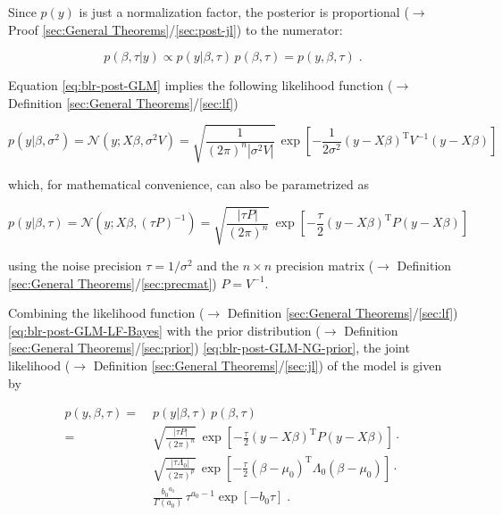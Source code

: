 \documentclass[a4paper,12pt,twoside]{book}
\begin{document}
Since $p(y)$ is just a normalization factor, the posterior is proportional ($\rightarrow$ Proof \ref{sec:General Theorems}/\ref{sec:post-jl}) to the numerator:

\begin{equation} \label{eq:blr-post-GLM-NG-post-JL}
p(\beta,\tau|y) \propto p(y|\beta,\tau) \, p(\beta,\tau) = p(y,\beta,\tau) \; .
\end{equation}

Equation \eqref{eq:blr-post-GLM} implies the following likelihood function ($\rightarrow$ Definition \ref{sec:General Theorems}/\ref{sec:lf})

\begin{equation} \label{eq:blr-post-GLM-LF-class}
p(y|\beta,\sigma^2) = \mathcal{N}(y; X \beta, \sigma^2 V) = \sqrt{\frac{1}{(2 \pi)^n |\sigma^2 V|}} \, \exp\left[ -\frac{1}{2 \sigma^2} (y-X\beta)^\mathrm{T} V^{-1} (y-X\beta) \right]
\end{equation}

which, for mathematical convenience, can also be parametrized as

\begin{equation} \label{eq:blr-post-GLM-LF-Bayes}
p(y|\beta,\tau) = \mathcal{N}(y; X \beta, (\tau P)^{-1}) = \sqrt{\frac{|\tau P|}{(2 \pi)^n}} \, \exp\left[ -\frac{\tau}{2} (y-X\beta)^\mathrm{T} P (y-X\beta) \right]
\end{equation}

using the noise precision $\tau = 1/\sigma^2$ and the $n \times n$ precision matrix ($\rightarrow$ Definition \ref{sec:General Theorems}/\ref{sec:precmat}) $P = V^{-1}$.

\vspace{1em}
Combining the likelihood function ($\rightarrow$ Definition \ref{sec:General Theorems}/\ref{sec:lf}) \eqref{eq:blr-post-GLM-LF-Bayes} with the prior distribution ($\rightarrow$ Definition \ref{sec:General Theorems}/\ref{sec:prior}) \eqref{eq:blr-post-GLM-NG-prior}, the joint likelihood ($\rightarrow$ Definition \ref{sec:General Theorems}/\ref{sec:jl}) of the model is given by

\begin{equation} \label{eq:blr-post-GLM-NG-JL-s1}
\begin{split}
p(y,\beta,\tau) = \; & p(y|\beta,\tau) \, p(\beta,\tau) \\
= \; & \sqrt{\frac{|\tau P|}{(2 \pi)^n}} \, \exp\left[ -\frac{\tau}{2} (y-X\beta)^\mathrm{T} P (y-X\beta) \right] \cdot \\
& \sqrt{\frac{|\tau \Lambda_0|}{(2 \pi)^p}} \, \exp\left[ -\frac{\tau}{2} (\beta-\mu_0)^\mathrm{T} \Lambda_0 (\beta-\mu_0) \right] \cdot \\
& \frac{ {b_0}^{a_0}}{\Gamma(a_0)} \, \tau^{a_0-1} \exp[-b_0 \tau] \; .
\end{split}
\end{equation}
\end{document}

